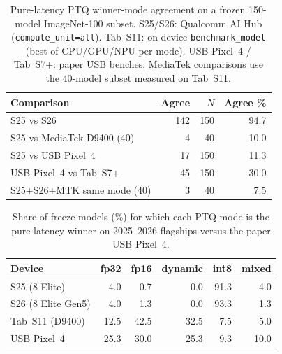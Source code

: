 \begin{table}[!t]
\centering
\caption{Pure-latency PTQ winner-mode agreement on a frozen 150-model
ImageNet-100 subset. S25/S26: Qualcomm AI Hub (\texttt{compute\_unit=all}).
Tab~S11: on-device \texttt{benchmark\_model} (best of CPU/GPU/NPU per mode).
USB Pixel~4 / Tab~S7+: paper USB benches. MediaTek comparisons use the 40-model
subset measured on Tab~S11.}
\label{tab:flagship-mode-agree}
\footnotesize
\begin{tabular}{@{}lrrr@{}}
\toprule
Comparison & Agree & $N$ & Agree \% \\
\midrule
S25 vs S26 & 142 & 150 & 94.7 \\
S25 vs MediaTek D9400 (40) & 4 & 40 & 10.0 \\
S25 vs USB Pixel~4 & 17 & 150 & 11.3 \\
USB Pixel~4 vs Tab~S7+ & 45 & 150 & 30.0 \\
S25+S26+MTK same mode (40) & 3 & 40 & 7.5 \\
\bottomrule
\end{tabular}
\end{table}

\begin{table}[!t]
\centering
\caption{Share of freeze models (\%) for which each PTQ mode is the
pure-latency winner on 2025--2026 flagships versus the paper USB Pixel~4.}
\label{tab:flagship-winrates}
\footnotesize
\begin{tabular}{@{}lrrrrr@{}}
\toprule
Device & fp32 & fp16 & dynamic & int8 & mixed \\
\midrule
S25 (8 Elite) & 4.0 & 0.7 & 0.0 & 91.3 & 4.0 \\
S26 (8 Elite Gen5) & 4.0 & 1.3 & 0.0 & 93.3 & 1.3 \\
Tab~S11 (D9400) & 12.5 & 42.5 & 32.5 & 7.5 & 5.0 \\
USB Pixel~4 & 25.3 & 30.0 & 25.3 & 9.3 & 10.0 \\
\bottomrule
\end{tabular}
\end{table}
